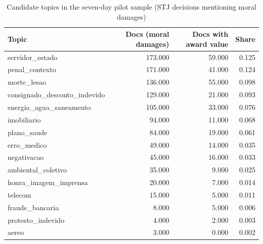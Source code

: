 \begin{table}[htbp]
\centering
\caption{Candidate topics in the seven-day pilot sample (STJ decisions mentioning moral damages)}
\label{tab:pilot_topics}
\begin{tabular}{lrrr}
\toprule
Topic & Docs (moral damages) & Docs with award value & Share
 \\
\midrule
servidor\_estado & 173.000 & 59.000 & 0.125 \\
penal\_contexto & 171.000 & 41.000 & 0.124 \\
morte\_lesao & 136.000 & 55.000 & 0.098 \\
consignado\_desconto\_indevido & 129.000 & 21.000 & 0.093 \\
energia\_agua\_saneamento & 105.000 & 33.000 & 0.076 \\
imobiliario & 94.000 & 11.000 & 0.068 \\
plano\_saude & 84.000 & 19.000 & 0.061 \\
erro\_medico & 49.000 & 14.000 & 0.035 \\
negativacao & 45.000 & 16.000 & 0.033 \\
ambiental\_coletivo & 35.000 & 9.000 & 0.025 \\
honra\_imagem\_imprensa & 20.000 & 7.000 & 0.014 \\
telecom & 15.000 & 5.000 & 0.011 \\
fraude\_bancaria & 8.000 & 5.000 & 0.006 \\
protesto\_indevido & 4.000 & 2.000 & 0.003 \\
aereo & 3.000 & 0.000 & 0.002 \\
\bottomrule
\end{tabular}
\end{table}
